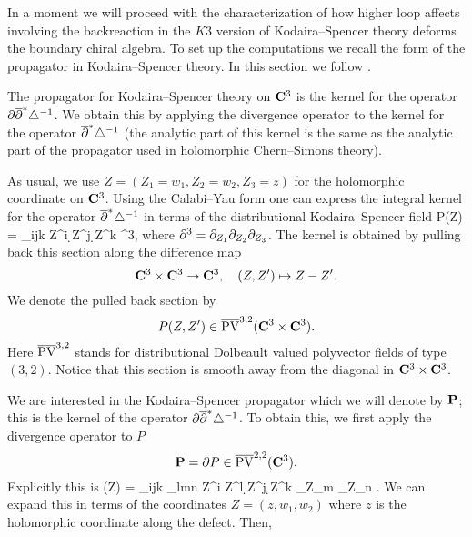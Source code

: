 \documentclass[../main.tex]{subfiles}
\begin{document}
In a moment we will proceed with the characterization of how higher loop affects involving the backreaction in the $K3$ version of Kodaira--Spencer theory deforms the boundary chiral algebra.
To set up the computations we recall the form of the propagator in Kodaira--Spencer theory.
In this section we follow \cite{CLbcov1}.

The propagator for Kodaira--Spencer theory on $\mathbf{C}^3$ is the kernel for the operator $\partial \overline{\partial}^* \triangle^{-1}$. 
We obtain this by applying the divergence operator to the kernel for the operator $\overline{\partial}^* \triangle^{-1}$ (the analytic part of this kernel is the same as the analytic part of the propagator used in holomorphic Chern--Simons theory). 

As usual, we use $Z = (Z_1 = w_1, Z_2=w_2,Z_3=z)$ for the holomorphic coordinate on $\mathbf{C}^3$.
Using the Calabi--Yau form one can express the integral kernel for the operator $\overline{\partial}^* \triangle^{-1}$ in terms of the distributional Kodaira--Spencer field
\beqn
P(Z) =  \ep_{ijk} \br Z^{i} \d \br Z^j \d \br Z^k \del^3,
\eeqn
where $\partial^3 = \partial_{Z_1} \partial_{Z_2} \partial_{Z_3}$.
The kernel is obtained by pulling back this section along the difference map 
\[
\mathbf{C}^3 \times \mathbf{C}^3 \to \mathbf{C}^3,\quad (Z,Z') \mapsto Z - Z' .
\]
We denote the pulled back section by
\[
P(Z,Z') \in \overline{{\rm PV}}^{3,2}(\mathbf{C}^3 \times \mathbf{C}^3) . 
\]
Here $\overline{{\rm PV}}^{3,2}$ stands for distributional Dolbeault valued polyvector fields of type $(3,2)$.
Notice that this section is smooth away from the diagonal in $\mathbf{C}^3 \times \mathbf{C}^3$. 

We are interested in the Kodaira--Spencer propagator which we will denote by $\bf P$; this is the kernel of the operator $\partial \overline{\partial}^* \triangle^{-1}$. 
To obtain this, we first apply the divergence operator to $P$ 
\[
\mathbf{P} = \partial P \in \overline{{\rm PV}}^{2,2}(\mathbf{C}^3) .
\]
Explicitly this is
\beqn
\bP (Z) =  \ep_{ijk} \ep_{lmn} \br Z^{i} \br Z^l \d \br Z^j \d \br Z^k \del_{Z_m} \del_{Z_n} .
\eeqn
We can expand this in terms of the coordinates $Z = (z,w_1,w_2)$ where $z$ is the holomorphic coordinate along the defect.
Then, 
\end{document}
